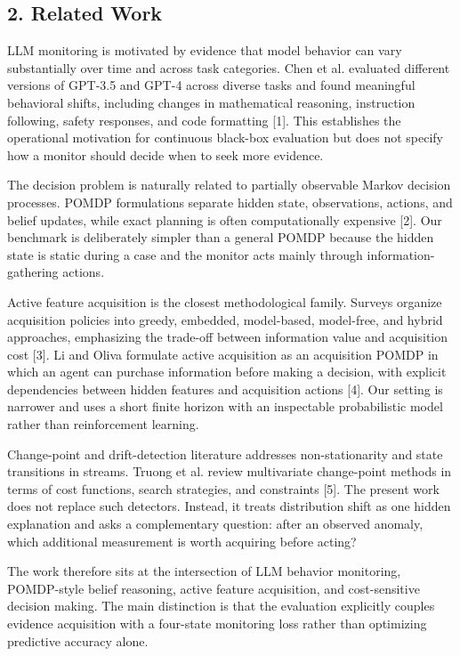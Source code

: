 \documentclass[
]{article}
\begin{document}
\subsection{2. Related Work}\label{2-related-work}

LLM monitoring is motivated by evidence that model behavior can vary substantially over time and across task categories. Chen et al. evaluated different versions of GPT-3.5 and GPT-4 across diverse tasks and found meaningful behavioral shifts, including changes in mathematical reasoning, instruction following, safety responses, and code formatting {[}1{]}. This establishes the operational motivation for continuous black-box evaluation but does not specify how a monitor should decide when to seek more evidence.

The decision problem is naturally related to partially observable Markov decision processes. POMDP formulations separate hidden state, observations, actions, and belief updates, while exact planning is often computationally expensive {[}2{]}. Our benchmark is deliberately simpler than a general POMDP because the hidden state is static during a case and the monitor acts mainly through information-gathering actions.

Active feature acquisition is the closest methodological family. Surveys organize acquisition policies into greedy, embedded, model-based, model-free, and hybrid approaches, emphasizing the trade-off between information value and acquisition cost {[}3{]}. Li and Oliva formulate active acquisition as an acquisition POMDP in which an agent can purchase information before making a decision, with explicit dependencies between hidden features and acquisition actions {[}4{]}. Our setting is narrower and uses a short finite horizon with an inspectable probabilistic model rather than reinforcement learning.

Change-point and drift-detection literature addresses non-stationarity and state transitions in streams. Truong et al. review multivariate change-point methods in terms of cost functions, search strategies, and constraints {[}5{]}. The present work does not replace such detectors. Instead, it treats distribution shift as one hidden explanation and asks a complementary question: after an observed anomaly, which additional measurement is worth acquiring before acting?

The work therefore sits at the intersection of LLM behavior monitoring, POMDP-style belief reasoning, active feature acquisition, and cost-sensitive decision making. The main distinction is that the evaluation explicitly couples evidence acquisition with a four-state monitoring loss rather than optimizing predictive accuracy alone.
\end{document}
